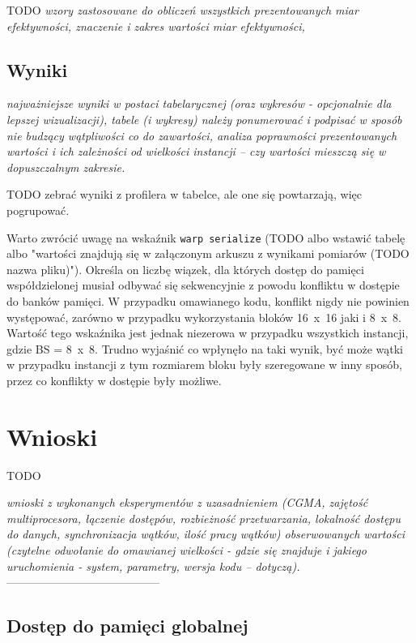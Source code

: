 \documentclass[12pt,a4paper]{article}
\begin{document}
TODO
\textit{wzory zastosowane do obliczeń wszystkich prezentowanych miar efektywności, znaczenie i zakres wartości
miar efektywności,}

\subsection{Wyniki}

\textit{najważniejsze wyniki w postaci tabelarycznej (oraz wykresów - opcjonalnie dla lepszej wizualizacji), tabele (i
wykresy) należy ponumerować i podpisać w sposób nie budzący wątpliwości co do zawartości, analiza
poprawności prezentowanych wartości i ich zależności od wielkości instancji – czy wartości mieszczą się w
dopuszczalnym zakresie.}

TODO zebrać wyniki z profilera w tabelce, ale one się powtarzają, więc pogrupować.

Warto zwrócić uwagę na wskaźnik \verb|warp serialize| (TODO albo wstawić tabelę albo "wartości znajdują się w załączonym arkuszu z wynikami pomiarów (TODO nazwa pliku)"). Określa on liczbę wiązek, dla których dostęp do pamięci współdzielonej musiał odbywać się sekwencyjnie z powodu konfliktu w dostępie do banków pamięci. W przypadku omawianego kodu, konflikt nigdy nie powinien występować, zarówno w przypadku wykorzystania bloków 16~x~16 jaki i 8~x~8. Wartość tego wskaźnika jest jednak niezerowa w przypadku wszystkich instancji, gdzie BS = 8~x~8. Trudno wyjaśnić co wpłynęło na taki wynik, być może wątki w przypadku instancji z tym rozmiarem bloku były szeregowane w inny sposób, przez co konflikty w dostępie były możliwe.

\section{Wnioski}

TODO

\textit{wnioski z wykonanych eksperymentów z uzasadnieniem (CGMA, zajętość multiprocesora, łączenie dostępów,
rozbieżność przetwarzania, lokalność dostępu do danych, synchronizacja wątków, ilość pracy wątków)
obserwowanych wartości (czytelne odwołanie do omawianej wielkości - gdzie się znajduje i jakiego
uruchomienia - system, parametry, wersja kodu – dotyczą).}\\
-----------------------------------------

\subsection{Dostęp do pamięci globalnej}
\end{document}
